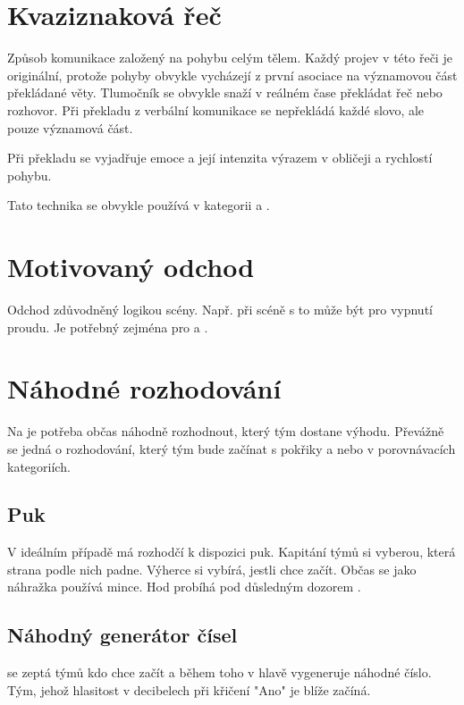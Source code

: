 \documentclass[main.tex]{subfiles}
\begin{document}
 
 
\needspace{5cm} \section{Kvaziznaková řeč} \label{kvaziznaková řeč} Způsob komunikace založený na pohybu celým tělem. Každý projev v této řeči je originální, protože pohyby obvykle vycházejí z první asociace na významovou část překládané věty. Tlumočník se obvykle snaží v reálném čase překládat řeč nebo rozhovor. Při překladu z verbální komunikace se nepřekládá každé slovo, ale pouze významová část. 
 
Při překladu se vyjadřuje emoce a její intenzita výrazem v obličeji a rychlostí pohybu. 
 
Tato technika se obvykle používá v kategorii  a . 
 
 
\needspace{5cm} \section{Motivovaný odchod} \label{motivovaný odchod} Odchod zdůvodněný logikou scény. Např. při scéně s  to může být pro vypnutí proudu. Je potřebný zejména pro  a . 
 
 
\needspace{5cm} \section{Náhodné rozhodování} \label{náhodné rozhodování} Na  je potřeba občas náhodně rozhodnout, který tým dostane výhodu. Převážně se jedná o rozhodování, který tým bude začínat s pokřiky a nebo v porovnávacích kategoriích. 
 
\subsection{ Puk } V ideálním případě má rozhodčí k dispozici puk. Kapitání týmů si vyberou, která strana podle nich padne. Výherce si vybírá, jestli chce začít. Občas se jako náhražka používá mince. Hod probíhá pod důsledným dozorem . 
 
\subsection{ Náhodný generátor čísel }  se zeptá týmů kdo chce začít a během toho v hlavě vygeneruje náhodné číslo. Tým, jehož hlasitost v decibelech při křičení "Ano"{} je blíže začíná. 
 
\end{document}
